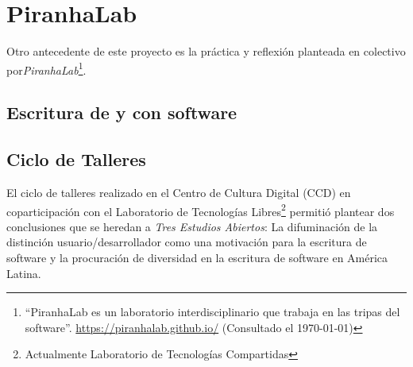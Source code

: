 



\section{PiranhaLab}

Otro antecedente de este proyecto es la práctica y reflexión planteada en colectivo por\textit{PiranhaLab}\footnote{``PiranhaLab es un laboratorio interdisciplinario que trabaja en las tripas del software''. \url{https://piranhalab.github.io/} (Consultado el \today)}.

\subsection{Escritura de y con software}

\subsection{Ciclo de Talleres}

El ciclo de talleres realizado en el Centro de Cultura Digital (CCD) en coparticipación con el Laboratorio de Tecnologías Libres\footnote{Actualmente Laboratorio de Tecnologías Compartidas} permitió plantear dos conclusiones que se heredan a \textit{Tres Estudios Abiertos}: La difuminación de la distinción usuario/desarrollador como una motivación para la escritura de software y la procuración de diversidad en la escritura de software en América Latina.

